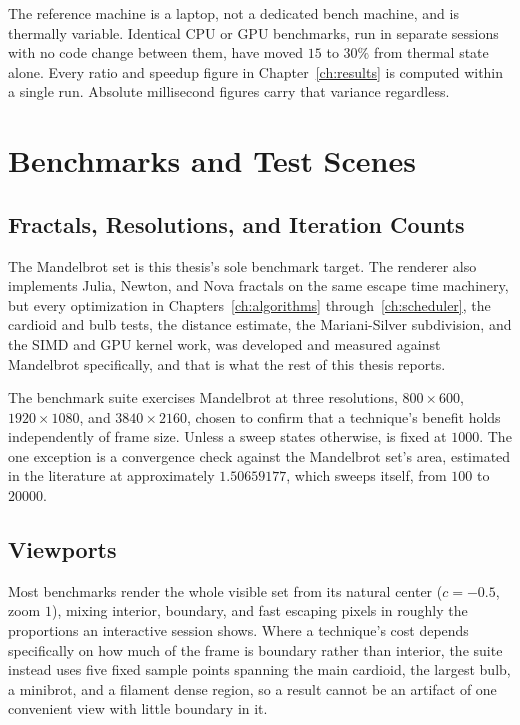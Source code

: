 \documentclass{ftndiplomski}
\begin{document}
The reference machine is a laptop, not a dedicated bench machine, and is
thermally variable. Identical CPU or GPU benchmarks, run in separate
sessions with no code change between them, have moved $15$ to $30\%$ from
thermal state alone. Every ratio and speedup figure in
Chapter~\ref{ch:results} is computed within a single run. Absolute
millisecond figures carry that variance regardless.

\section{Benchmarks and Test Scenes}
\label{sec:benchmarks}

\subsection{Fractals, Resolutions, and Iteration Counts}
\label{sec:bench-resolutions}

The Mandelbrot set is this thesis's sole benchmark target. The renderer
also implements Julia, Newton, and Nova fractals on the same escape time
machinery, but every optimization in
Chapters~\ref{ch:algorithms} through~\ref{ch:scheduler}, the cardioid and
bulb tests, the distance estimate, the Mariani-Silver subdivision, and
the SIMD and GPU kernel work, was developed and measured against
Mandelbrot specifically, and that is what the rest of this thesis
reports.

The benchmark suite exercises Mandelbrot at three resolutions,
$800\times600$, $1920\times1080$, and $3840\times2160$, chosen to
confirm that a technique's benefit holds independently of frame size.
Unless a sweep states otherwise,  is fixed at $1000$. The
one exception is a convergence check against the Mandelbrot set's area,
estimated in the literature at approximately $1.50659177$, which sweeps
 itself, from $100$ to $20000$.

\subsection{Viewports}
\label{sec:bench-viewports}

Most benchmarks render the whole visible set from its natural center
($c=-0.5$, zoom $1$), mixing interior, boundary, and fast escaping pixels
in roughly the proportions an interactive session shows. Where a
technique's cost depends specifically on how much of the frame is
boundary rather than interior, the suite instead uses five fixed sample
points spanning the main cardioid, the largest bulb, a minibrot, and a
filament dense region, so a result cannot be an artifact of one
convenient view with little boundary in it.
\end{document}
